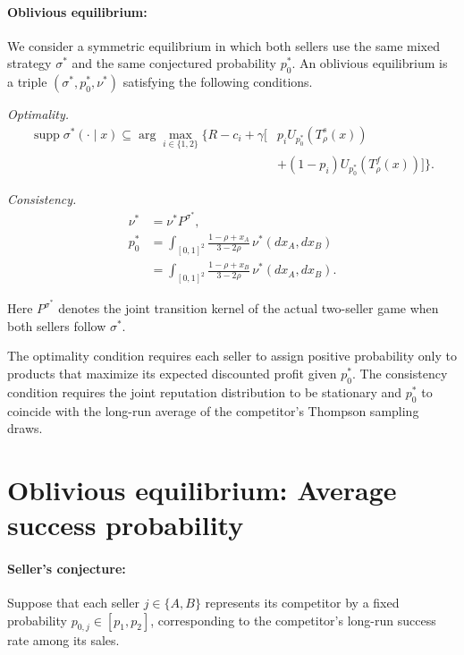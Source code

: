 \documentclass[11pt]{article}
\begin{document}
\paragraph{Oblivious equilibrium:}
We consider a symmetric equilibrium in which both sellers
use the same mixed strategy $\sigma^*$ and the same
conjectured probability $p_0^*$. An oblivious equilibrium is a triple
$(\sigma^*,p_0^*,\nu^*)$ satisfying the following conditions.

\textit{Optimality.}
\begin{equation}
\begin{aligned}
\operatorname{supp}\sigma^*(\cdot\mid x)
\subseteq
\arg\max_{i\in\{1,2\}}
\Big\{
R-c_i
+\gamma\big[
&p_iU_{p_0^*}(T_\rho^s(x))\\
&+(1-p_i)U_{p_0^*}(T_\rho^f(x))
\big]
\Big\}.
\end{aligned}
\end{equation}

\textit{Consistency.}
\begin{equation}
\begin{aligned}
\nu^*&=\nu^*P^{\sigma^*},\\
p_0^*
&=
\int_{[0,1]^2}
\frac{1-\rho+x_A}{3-2\rho}
\,\nu^*(dx_A,dx_B)\\
&=
\int_{[0,1]^2}
\frac{1-\rho+x_B}{3-2\rho}
\,\nu^*(dx_A,dx_B).
\end{aligned}
\end{equation}

Here $P^{\sigma^*}$ denotes the joint transition kernel
of the actual two-seller game when both sellers follow
$\sigma^*$.

The optimality condition requires each seller to assign positive probability only to products that maximize its expected discounted profit given $p_0^*$. The consistency condition requires the joint reputation distribution to be stationary and $p_0^*$ to coincide with the long-run average of the competitor's Thompson sampling draws.



\section{Oblivious equilibrium: Average success probability}

\paragraph{Seller's conjecture:}
Suppose that each seller $j\in\{A,B\}$ represents its
competitor by a fixed probability $p_{0,j}\in[p_1,p_2]$,
corresponding to the competitor's long-run success rate
among its sales.
\end{document}

